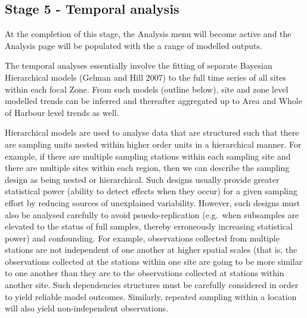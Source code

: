 \documentclass[
  8pt,
  a4paper]{article}
\begin{document}
\subsection{Stage 5 - Temporal
analysis}\label{stage-5---temporal-analysis}

At the completion of this stage, the Analysis menu will become active
and the Analysis page will be populated with the a range of modelled
outputs.

The temporal analyses essentially involve the fitting of separate
Bayesian Hierarchical models (Gelman and Hill 2007) to the full time
series of all sites within each focal Zone. From such models (outline
below), site and zone level modelled trends can be inferred and
thereafter aggregated up to Area and Whole of Harbour level trends as
well.

\begin{tcolorbox}[enhanced jigsaw, coltitle=black, rightrule=.15mm, left=2mm, leftrule=.75mm, colframe=quarto-callout-note-color-frame, colback=white, bottomrule=.15mm, toprule=.15mm, bottomtitle=1mm, opacityback=0, toptitle=1mm, colbacktitle=quarto-callout-note-color!10!white, titlerule=0mm, arc=.35mm, title=\textcolor{quarto-callout-note-color}{\faInfo}\hspace{0.5em}{Bayesian hierarchical models}, breakable, opacitybacktitle=0.6]

Hierarchical models are used to analyse data that are structured such
that there are sampling units nested within higher order units in a
hierarchical manner. For example, if there are multiple sampling
stations within each sampling site and there are multiple sites within
each region, then we can describe the sampling design as being nested or
hierarchical. Such designs usually provide greater statistical power
(ability to detect effects when they occur) for a given sampling effort
by reducing sources of unexplained variability. However, such designs
must also be analysed carefully to avoid psuedo-replication (e.g.~when
subsamples are elevated to the status of full samples, thereby
erroneously increasing statistical power) and confounding. For example,
observations collected from multiple stations are not independent of one
another at higher spatial scales (that is, the observations collected at
the stations within one site are going to be more similar to one another
than they are to the observations collected at stations within another
site. Such dependencies structures must be carefully considered in order
to yield reliable model outcomes. Similarly, repeated sampling within a
location will also yield non-independent observations.


\end{tcolorbox}
\end{document}
